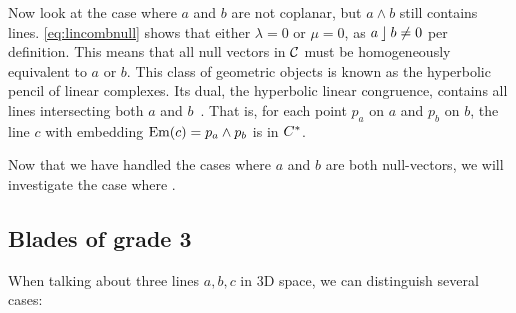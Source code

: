 Now look at the case where $a$ and $b$ are not coplanar, but $a \wedge b$ still contains lines.  \autoref{eq:lincombnull} shows that either $\lambda = 0$ or $\mu = 0$, as $a \mathbin{\rfloor} b \not= 0$ per definition.  This means that all null vectors in $\mathcal{C}$ must be homogeneously equivalent to $a$ or $b$.  This class of geometric objects is known as the hyperbolic pencil of linear complexes.  Its dual, the hyperbolic linear congruence, contains all lines intersecting both $a$ and $b$~\cite[Proposition 3.2.3]{Pottmann}. That is, for each point $p_a$ on $a$ and $p_b$ on $b$, the line $c$ with embedding $\operatorname{Em}(c) = p_a \wedge p_b$ is in $C^\ast$.  

Now that we have handled the cases where $a$ and $b$ are both null-vectors, we will investigate the case where .

\subsection{Blades of grade 3}
%
When talking about three lines $a, b, c$ in 3D space, we can distinguish several cases:

